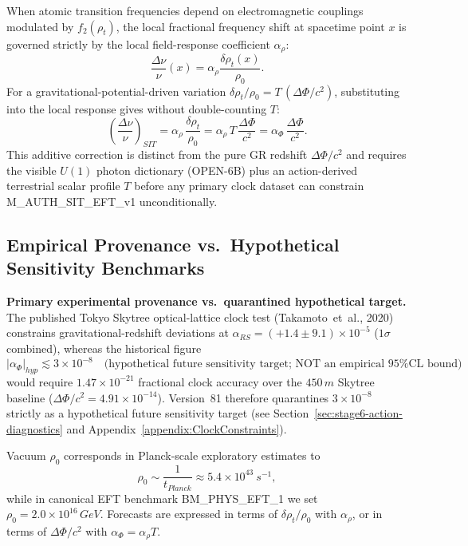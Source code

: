 \documentclass[american,11pt,letterpaper]{article}
\def\mathcal#1{#1}%
\def\mathrm#1{#1}%
\def\texttt#1{#1}%
\def\emph#1{#1}%
\begin{document}
When atomic transition frequencies depend on electromagnetic couplings modulated by \(f_2(\rho_t)\), the local fractional frequency shift at spacetime point \(x\) is governed strictly by the local field-response coefficient \(\alpha_\rho\):
\[
\frac{\Delta \nu}{\nu}(x) = \alpha_\rho \frac{\delta \rho_t(x)}{\rho_0}.
\]
For a gravitational-potential-driven variation \(\delta\rho_t/\rho_0 = \mathcal{T}\,(\Delta\Phi/c^2)\), substituting into the local response gives without double-counting \(\mathcal{T}\):
\[
\left(\frac{\Delta \nu}{\nu}\right)_{\mathrm{SIT}}
= \alpha_\rho\,\frac{\delta \rho_t}{\rho_0}
= \alpha_\rho\,\mathcal{T}\,\frac{\Delta\Phi}{c^2}
= \alpha_\Phi\,\frac{\Delta\Phi}{c^2}.
\]
This additive correction is distinct from the pure GR redshift \(\Delta\Phi/c^2\) and requires the visible \(U(1)\) photon dictionary (\texttt{OPEN-6B}) plus an action-derived terrestrial scalar profile \(\mathcal{T}\) before any primary clock dataset can constrain \texttt{M\_AUTH\_SIT\_EFT\_v1} unconditionally.

\subsection{Empirical Provenance vs.\ Hypothetical Sensitivity Benchmarks}

\textbf{Primary experimental provenance vs.\ quarantined hypothetical target.} The published Tokyo Skytree optical-lattice clock test (Takamoto~\emph{et~al.}, 2020) constrains gravitational-redshift deviations at \(\alpha_{\mathrm{RS}} = (+1.4 \pm 9.1)\times 10^{-5}\) (\(1\sigma\) combined), whereas the historical figure
\[
|\alpha_\Phi|_{\mathrm{hyp}} \lesssim 3 \times 10^{-8} \quad \text{(hypothetical future sensitivity target; NOT an empirical 95\% CL bound)}
\]
would require \(1.47\times 10^{-21}\) fractional clock accuracy over the \(450\,\mathrm{m}\) Skytree baseline (\(\Delta\Phi/c^2 = 4.91\times 10^{-14}\)). Version~81 therefore quarantines \(3\times 10^{-8}\) strictly as a hypothetical future sensitivity target (see Section~\ref{sec:stage6-action-diagnostics} and Appendix~\ref{appendix:ClockConstraints}).

Vacuum \(\rho_0\) corresponds in Planck-scale exploratory estimates to
\[
\rho_0 \sim \frac{1}{t_{\mathrm{Planck}}} \approx 5.4 \times 10^{43} \ \mathrm{s}^{-1},
\]
while in canonical EFT benchmark \texttt{BM\_PHYS\_EFT\_1} we set \(\rho_0 = 2.0\times 10^{16}\,\mathrm{GeV}\). Forecasts are expressed in terms of \(\delta\rho_t/\rho_0\) with \(\alpha_\rho\), or in terms of \(\Delta\Phi/c^2\) with \(\alpha_\Phi = \alpha_\rho\mathcal{T}\).
\end{document}
